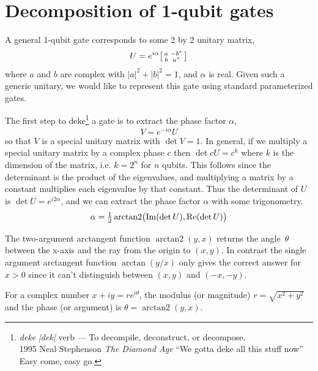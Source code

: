 


\clearpage
\section{Decomposition of 1-qubit gates}
A general 1-qubit gate corresponds to some 2 by 2 unitary matrix,
\[
U = 
e^{i\alpha}\begin{bsmallmatrix}
a & -b^* \\
b & a^*
\end{bsmallmatrix}\]
where $a$ and $b$ are complex with $|a|^2 + |b|^2 = 1$, and  $\alpha$ is real.
Given such a generic unitary, we would like to represent this gate using standard parameterized gates.   

The first step to deke\footnote{
{\sl deke} {\sl |dek|} verb --- To decompile, deconstruct, or decompose.
\\ 1995  Neal Stephenson {\sl The Diamond Age} ``We gotta deke all this stuff now'' Easy come, easy go.
} a gate is to extract the phase factor $\alpha$,
\[
V = e^{-i\alpha} U
\]
so that $V$ is a special unitary matrix with $\det V=1$. In general, if we multiply a special unitary matrix by a complex phase $c$ then $\det cU=c^k$ where $k$ is the dimension of the matrix, i.e. $k=2^n$ for $n$ qubits. This follows since the determinant is the product of the eigenvalues, and multiplying a matrix by a constant multiplies each eigenvalue by that constant.
Thus the determinant of $U$ is $\det U=e^{i 2 \alpha }$, and we can extract the phase factor $\alpha$ with some trigonometry.
\[
\alpha = \tfrac{1}{2} \operatorname{arctan2}\bigl(\operatorname{Im}(\det U), \operatorname{Re}(\det U)\bigr)
\label{phase_extraction}
\]

The two-argument arctangent function $\operatorname{arctan2}(y,x)$ returns the angle~$\theta$ between the x-axis and the ray from the origin to $(x, y)$. In contrast the single argument arctangent function $\arctan(y/x)$ only gives the correct answer for $x>0$ since it can't distinguish between $(x,y)$ and $(-x, -y)$.
\begin{center}
\end{center}
For a complex number $x+iy = r e^{i\theta}$, the modulus (or magnitude) $r=\sqrt{x^2+y^2}$ and the phase (or argument) is $\theta = \operatorname{arctan2}(y,x)$. 

